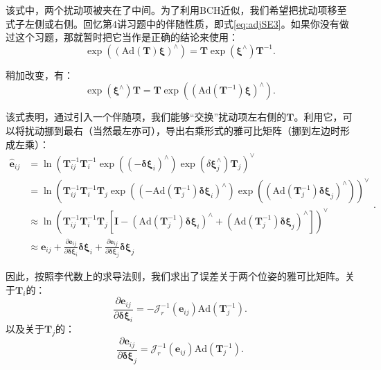 该式中，两个扰动项被夹在了中间。为了利用BCH近似，我们希望把扰动项移至式子左侧或右侧。回忆第4讲习题中的伴随性质，即式\eqref{eq:adjSE3}。如果你没有做过这个习题，那就暂时把它当作是正确的结论来使用：
\begin{equation}
\exp \left( \left( \mathrm{Ad}(\bm{T}) \bm{\xi} \right) ^\wedge \right) = \bm{T} \exp(\bm{\xi}^\wedge)\bm{T}^{-1}.
\end{equation}

稍加改变，有：
\begin{equation}
\exp(\bm{\xi}^\wedge)\bm{T} = \bm{T} \exp \left( \left( \mathrm{Ad}(\bm{T}^{-1}) \bm{\xi} \right) ^\wedge \right) .
\end{equation}

该式表明，通过引入一个伴随项，我们能够“交换”扰动项左右侧的$\bm{T}$。利用它，可以将扰动挪到最右（当然最左亦可），导出右乘形式的雅可比矩阵（挪到左边时形成左乘）：
\begin{equation}
\begin{aligned}
\hat{ \bm{e}}_{ij} &= \ln \left( \bm{T}_{ij}^{-1}  \bm{T}_i^{-1} \exp((-\bm{\delta \xi}_i)^\wedge) \exp(\delta \bm{\xi}_j^\wedge) \bm{T}_j  \right)^\vee\\
&= \ln \left( \bm{T}_{ij}^{-1} \bm{T}_i^{-1} \bm{T}_j \exp \left( \left(- \mathrm{Ad}(\bm{T}_j^{-1}) \bm{\delta \xi}_i \right)^\wedge \right) \exp \left( \left( \mathrm{Ad}(\bm{T}_j^{-1})  \bm{\delta\xi}_j\right)^\wedge \right) \right)^\vee \\ 
&\approx \ln \left( \bm{T}_{ij}^{-1} \bm{T}_i^{-1} \bm{T}_j \left[ \bm{I} - (\mathrm{Ad}(\bm{T}_j^{-1}) \bm{\delta \xi}_i)^\wedge + (\mathrm{Ad}(\bm{T}_j^{-1})  \bm{\delta \xi}_j)^{\wedge} \right] \right)^\vee \\
& \approx \bm{e}_{ij} + \frac{\partial \bm{e}_{ij}}{\partial \bm{\delta \xi}_i} \bm{\delta \xi}_i + \frac{\partial \bm{e}_{ij}}{\partial \bm{\delta \xi}_j} \bm{\delta \xi}_j
\end{aligned}.
\end{equation}

因此，按照李代数上的求导法则，我们求出了误差关于两个位姿的雅可比矩阵。关于$\bm{T}_i$的：
\begin{equation}
\frac{\partial \bm{e}_{ij}}{\partial \bm{\delta \xi}_i} = - \bm{\mathcal{J}}_r^{-1}(\bm{e}_{ij}) \mathrm{Ad}(\bm{T}_j^{-1}).
\end{equation}
以及关于$\bm{T}_j$的：
\begin{equation}
\frac{\partial \bm{e}_{ij}}{\partial \bm{\delta \xi}_j} = \bm{\mathcal{J}}_r^{-1}(\bm{e}_{ij}) \mathrm{Ad}(\bm{T}_j^{-1}).
\end{equation}

